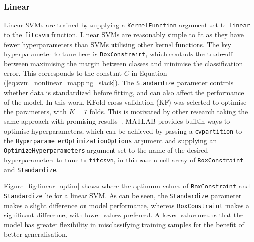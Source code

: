 \subsubsection{Linear}

Linear SVMs are trained by supplying a \texttt{KernelFunction} argument set to
\texttt{linear} to the \texttt{fitcsvm} function. Linear SVMs are reasonably
simple to fit as they have fewer hyperparameters than SVMs utilising other kernel
functions. The key hyperparameter to tune here is \texttt{BoxConstraint}, which
controls the trade-off between maximising the margin between classes and
minimise the classification error. This corresponds to the constant $C$ in
Equation (\ref{eq:svm_nonlinear_mapping_slack}). The \texttt{Standardize}
parameter controls whether data is standardized before fitting, and can also
affect the performance of the model. In this work, KFold cross-validation (KF)
was selected to optimise the parameters, with $K=7$ folds. This is motivated by
other research taking the same approach with promising
results~\cite{ramashini2022robust}. MATLAB provides builtin ways to optimise
hyperparameters, which can be achieved by passing a \texttt{cvpartition} to the
\texttt{HyperparameterOptimizationOptions} argument and supplying an
\texttt{OptimizeHyperparameters} argument set to the name of the desired
hyperparameters to tune to \texttt{fitcsvm}, in this case a cell array of
\texttt{BoxConstraint} and \texttt{Standardize}.

Figure~\ref{fig:linear_optim} shows where the optimum values of
\texttt{BoxConstraint} and \texttt{Standardize} lie for a linear SVM\@. As can
be seen, the \texttt{Standardize} parameter makes a slight difference on model
performance, whereas \texttt{BoxConstraint} makes a significant difference, with
lower values preferred. A lower value means that the model has greater
flexibility in misclassifying training samples for the benefit of better
generalisation.

